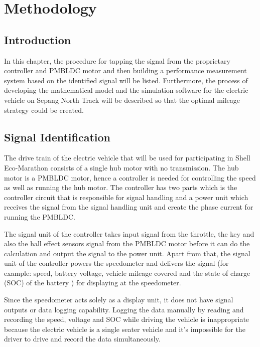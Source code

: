 \chapter{Methodology}\label{chap:methodology}
\section{Introduction}
In this chapter, the procedure for tapping the signal from the proprietary controller and PMBLDC motor and then building a performance measurement system based on the identified signal will be listed. Furthermore, the process of developing the mathematical model and the simulation software for the electric vehicle on Sepang North Track will be described so that the optimal mileage strategy could be created.


\section{Signal Identification}
The drive train of the electric vehicle that will be used for participating in Shell Eco-Marathon consists of a single hub motor with no transmission. The hub motor is a PMBLDC motor, hence a controller is needed for controlling the speed as well as running the hub motor. The controller has two parts which is the controller circuit that is responsible for signal handling and a power unit which receives the signal from the signal handling unit and create the phase current for running the PMBLDC.

The signal unit of the controller takes input signal from the throttle, the key and also the hall effect sensors signal from the PMBLDC motor before it can do the calculation and output the signal to the power unit. Apart from that, the signal unit of the controller powers the speedometer and delivers the signal (for example:  speed, battery voltage, vehicle mileage covered and the state of charge (SOC) of the battery ) for displaying at the speedometer.

Since the speedometer acts solely as a display unit, it does not have signal outputs or data logging capability. Logging the data manually by reading and recording the speed, voltage and SOC while driving the vehicle is inappropriate because the electric vehicle is a single seater vehicle and it's impossible for the driver to drive and record the data simultaneously. 

